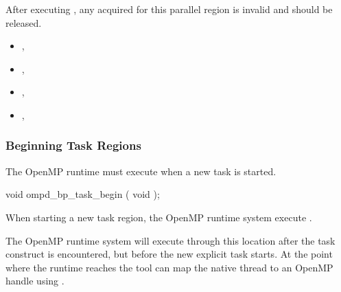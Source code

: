 After 
executing , any  acquired for this
parallel region is invalid and should be released.

%
%

\crossreferences
\begin{itemize}
\item
  , 
\item
  , 
\item
  , 
\item
  , 
\end{itemize}


\subsubsection{Beginning Task Regions}
\label{subsubsec:ompd_bp_task_begin}

The OpenMP runtime must execute %
 when a new task is started.


\begin{cspecific}
\begin{ompSyntax}
void ompd_bp_task_begin ( void );
\end{ompSyntax}
\end{cspecific}


\descr

When starting a new task region, the OpenMP runtime system
execute .

The OpenMP runtime system will execute through this location after the task
construct is encountered, but before the new explicit task starts.
At the point where the runtime reaches 
the tool can map the native thread to an OpenMP handle using
.


